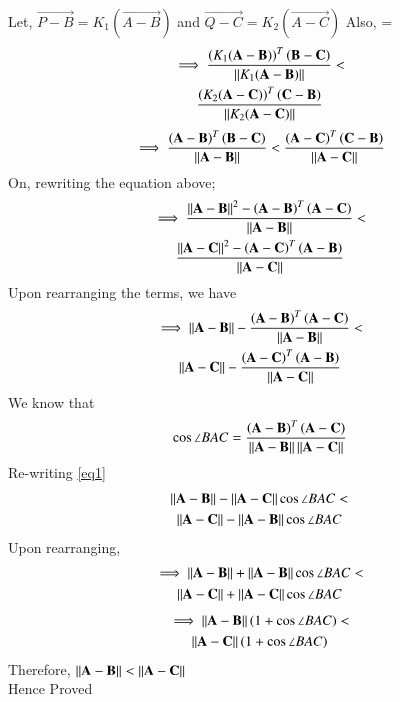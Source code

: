 \documentclass[journal,12pt,twocolumn]{IEEEtran}
\begin{document}
Let, $\vec{ P - B}= K_1 (\vec{ A - B})$ and $\vec{ Q - C} = K_2 (\vec{ A - C})$
Also,  = 
\begin{multline}
\implies\frac{\left(K_1 (\mathbf{A - B}) \right)^T  \left( \mathbf{B - C } \right)}{\left\lVert K_1(\mathbf{ A - B})\right\rVert }<\\\frac{\left(K_2 (\mathbf{A - C}) \right)^T  \left( \mathbf{C - B} \right)}{\left\lVert K_2(\mathbf{ A - C})\right\rVert}
\end{multline}
\begin{align}
\implies\frac{\left( \mathbf{A - B} \right)^T  \left( \mathbf{B - C } \right)}{\left\lVert\mathbf{ A - B}\right\rVert }<\frac{\left( \mathbf{ A - C} \right)^T  \left( \mathbf{C - B} \right)}{\left\lVert\mathbf{ A - C}\right\rVert}
\end{align}
On, rewriting the equation above;
\begin{multline}
\implies\frac{\left\lVert\mathbf{ A - B}\right\rVert^2 - \left( \mathbf{A - B } \right)^T \left( \mathbf{A - C } \right)}{\left\lVert\mathbf{ A - B}\right\rVert}<\\ \frac{\left\lVert\mathbf{ A - C}\right\rVert^2 - \left( \mathbf{A - C } \right)^T \left( \mathbf{A - B } \right)}{\left\lVert\mathbf{ A - C}\right\rVert}
\end{multline}
Upon rearranging the terms, we have
\begin{multline}
\implies\left\lVert\mathbf{ A - B}\right\rVert-\frac{ \left( \mathbf{A - B } \right)^T \left( \mathbf{A - C } \right)}{\left\lVert\mathbf{ A - B}\right\rVert}<\\ \left\lVert\mathbf{ A - C}\right\rVert-\frac{ \left( \mathbf{A - C } \right)^T \left( \mathbf{A - B } \right)}{\left\lVert\mathbf{ A - C}\right\rVert}\label{eq1}
\end{multline}
We know that 
\begin{align}
\cos\angle BAC= \frac{\left( \mathbf{A - B } \right)^T \left( \mathbf{A - C } \right)}{\left\lVert\mathbf{ A - B}\right\rVert\left\lVert\mathbf{ A - C}\right\rVert}
\end{align}
Re-writing \eqref{eq1}
\begin{multline}
\left\lVert\mathbf{A - B} \right\rVert-\left\lVert\mathbf{A - C} \right\rVert\cos\angle BAC<\\\left\lVert\mathbf{ A - C}\right\rVert-\left\lVert\mathbf{A - B} \right\rVert\cos\angle BAC
\end{multline}  
Upon rearranging,
\begin{multline}
\implies\left\lVert\mathbf{A - B} \right\rVert+\left\lVert\mathbf{A - B} \right\rVert\cos\angle BAC<\\\left\lVert\mathbf{A - C}\right\rVert+\left\lVert\mathbf{A - C} \right\rVert\cos\angle BAC\end{multline}
\begin{multline}
\implies
\left\lVert\mathbf{A - B} \right\rVert(1+\cos\angle BAC)<\\\left\lVert\mathbf{A - C} \right\rVert(1+\cos\angle BAC)\end{multline}
Therefore,
$\left\lVert\mathbf{A - B}\right\rVert < \left\lVert\mathbf{A - C}\right\rVert$\\
Hence Proved
\end{document}
